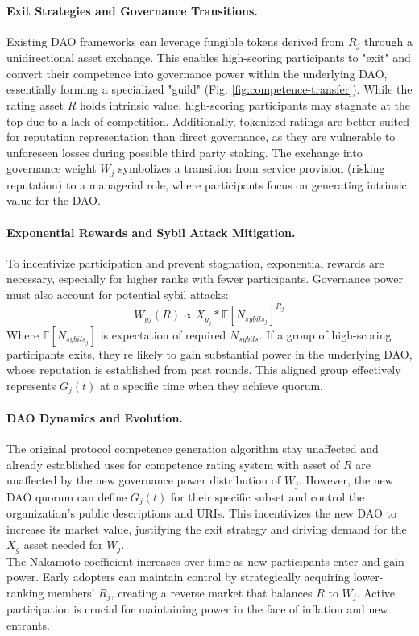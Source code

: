 \documentclass{article}
\begin{document}
\begin{CJK}{UTF8}{gbsn}
\begin{multicols}{2}
            \paragraph{Exit Strategies and Governance Transitions.}
            Existing DAO frameworks can leverage fungible tokens derived from $R_{j}$ through a unidirectional asset exchange. This enables high-scoring participants to "exit" and convert their competence into governance power within the underlying DAO, essentially forming a specialized "guild" (Fig. \ref{fig:competence-transfer}).
            While the rating asset $R$ holds intrinsic value, high-scoring participants may stagnate at the top due to a lack of competition. Additionally, tokenized ratings are better suited for reputation representation than direct governance, as they are vulnerable to unforeseen losses during possible third party staking. The exchange into governance weight $W_j$ symbolizes a transition from service provision (risking reputation) to a managerial role, where participants focus on generating intrinsic value for the DAO.
            \paragraph{Exponential Rewards and Sybil Attack Mitigation.}
            To incentivize participation and prevent stagnation, exponential rewards are necessary, especially for higher ranks with fewer participants. Governance power must also account for potential sybil attacks:
            \begin{equation}
                W_{gj}(R) \propto  X_{g_j}*\mathbb{E}[N_{sybils_j}]^{R_j}
            \end{equation}
            Where $\mathbb{E}[N_{sybils_j}]$ is expectation of required $N_{sybils}$. If a group of high-scoring participants exits, they're likely to gain substantial power in the underlying DAO, whose reputation is established from past rounds. This aligned group effectively represents $G_j(t)$  at a specific time when they achieve quorum.

            \paragraph{DAO Dynamics and Evolution.} The original protocol competence generation algorithm stay unaffected and already established uses for competence rating system with asset of $R$ are unaffected by the new governance power distribution of $W_j$. However, the new DAO quorum can define $G_j(t)$ for their specific subset and control the organization's public descriptions and URIs. This incentivizes the new DAO to increase its market value, justifying the exit strategy and driving demand for the $X_g$ asset needed for $W_j$.\\
            The Nakamoto coefficient increases over time as new participants enter and gain power. Early adopters can maintain control by strategically acquiring lower-ranking members' $R_{j}$, creating a reverse market that balances $R$ to $W_j$. Active participation is crucial for maintaining power in the face of inflation and new entrants.

\end{multicols}
\end{CJK}
\end{document}
